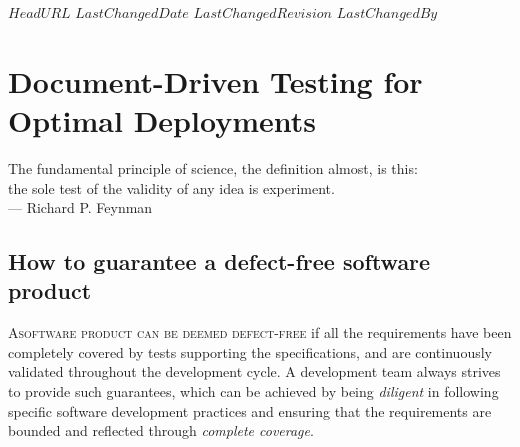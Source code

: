 \svnidlong
{$HeadURL$}
{$LastChangedDate$}
{$LastChangedRevision$}
{$LastChangedBy$}

\chapter{Document-Driven Testing for Optimal Deployments}

\begin{introduction}
  \begin{flushright}
  \vspace{-13mm}The fundamental principle of science, the definition almost, is this: \\ the sole test of the validity of any idea is experiment. \\
  --- Richard P. Feynman
  \end{flushright}
\end{introduction}


\text{}\vspace{-18mm}
\section{How to guarantee a defect-free software product}

\lettrine[nindent=-1pt]{A}{software product can be deemed defect-free} if all the requirements have been completely covered by tests supporting the specifications, and are continuously validated throughout the development cycle.  A development team always strives to provide such guarantees, which can be achieved by being \emph{diligent} in following specific software development practices and ensuring that the requirements are bounded and reflected through \emph{complete coverage}.  \\


